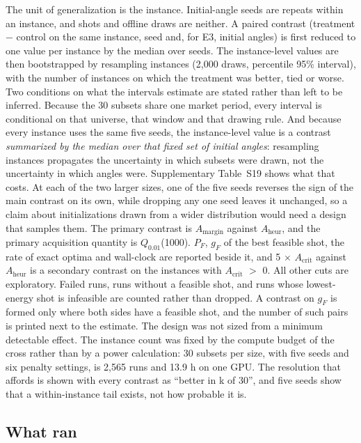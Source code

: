 \documentclass{ieeeaccess}
\begin{document}
The unit of generalization is the instance. Initial-angle seeds are repeats within an instance, and shots and offline draws are neither. A paired contrast (treatment $-$ control on the same instance, seed and, for E3, initial angles) is first reduced to one value per instance by the median over seeds. The instance-level values are then bootstrapped by resampling instances (2,000 draws, percentile 95\% interval), with the number of instances on which the treatment was better, tied or worse. Two conditions on what the intervals estimate are stated rather than left to be inferred. Because the 30 subsets share one market period, every interval is conditional on that universe, that window and that drawing rule. And because every instance uses the same five seeds, the instance-level value is a contrast \textit{summarized by the median over that fixed set of initial angles}: resampling instances propagates the uncertainty in which subsets were drawn, not the uncertainty in which angles were. Supplementary Table~S19 shows what that costs. At each of the two larger sizes, one of the five seeds reverses the sign of the main contrast on its own, while dropping any one seed leaves it unchanged, so a claim about initializations drawn from a wider distribution would need a design that samples them. The primary contrast is $A_{\mathrm{margin}}$ against $A_{\mathrm{heur}}$, and the primary acquisition quantity is $Q_{0.01}$(1000). $P_{F}$, $g_{F}$ of the best feasible shot, the rate of exact optima and wall-clock are reported beside it, and 5 $\times$ $A_{\mathrm{crit}}$ against $A_{\mathrm{heur}}$ is a secondary contrast on the instances with $A_{\mathrm{crit}}$ $>$ 0. All other cuts are exploratory. Failed runs, runs without a feasible shot, and runs whose lowest-energy shot is infeasible are counted rather than dropped. A contrast on $g_{F}$ is formed only where both sides have a feasible shot, and the number of such pairs is printed next to the estimate. The design was not sized from a minimum detectable effect. The instance count was fixed by the compute budget of the cross rather than by a power calculation: 30 subsets per size, with five seeds and six penalty settings, is 2,565 runs and 13.9 h on one GPU. The resolution that affords is shown with every contrast as ``better in k of 30'', and five seeds show that a within-instance tail exists, not how probable it is.


\subsection{What ran}
\end{document}
